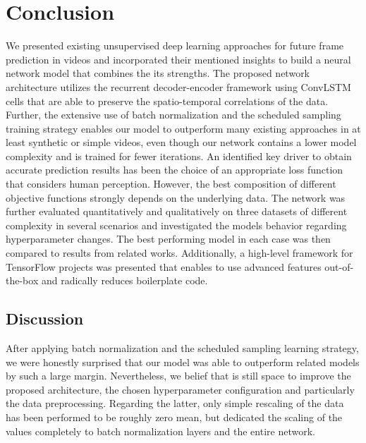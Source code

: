 
\chapter{Conclusion} \label{chapter:conclusion}

We presented existing unsupervised deep learning approaches for future frame prediction in videos and incorporated their mentioned insights to build a neural network model that combines the its strengths. The proposed network architecture utilizes the recurrent decoder-encoder framework using ConvLSTM cells that are able to preserve the spatio-temporal correlations of the data. Further, the extensive use of batch normalization and the scheduled sampling training strategy enables our model to outperform many existing approaches in at least synthetic or simple videos, even though our network contains a lower model complexity and is trained for fewer iterations. An identified key driver to obtain accurate prediction results has been the choice of an appropriate loss function that considers human perception. However, the best composition of different objective functions strongly depends on the underlying data. The network was further evaluated quantitatively and qualitatively on three datasets of different complexity in several scenarios and investigated the models behavior regarding hyperparameter changes. The best performing model in each case was then compared to results from related works. Additionally, a high-level framework for TensorFlow projects was presented that enables to use advanced features out-of-the-box and radically reduces boilerplate code.

\section{Discussion}

After applying batch normalization and the scheduled sampling learning strategy, we were honestly surprised that our model was able to outperform related models by such a large margin. Nevertheless, we belief that is still space to improve the proposed architecture, the chosen hyperparameter configuration and particularly the data preprocessing. Regarding the latter, only simple rescaling of the data has been performed to be roughly zero mean, but dedicated the scaling of the values completely to batch normalization layers and the entire network.

